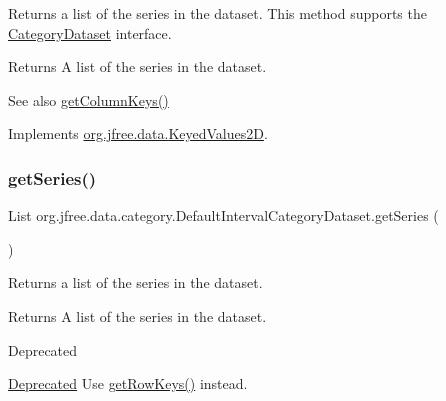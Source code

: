 Returns a list of the series in the dataset. This method supports the \mbox{\hyperlink{interfaceorg_1_1jfree_1_1data_1_1category_1_1_category_dataset}{Category\+Dataset}} interface.

\begin{DoxyReturn}{Returns}
A list of the series in the dataset.
\end{DoxyReturn}
\begin{DoxySeeAlso}{See also}
\mbox{\hyperlink{classorg_1_1jfree_1_1data_1_1category_1_1_default_interval_category_dataset_a1601fe05521b19269fc838d371907613}{get\+Column\+Keys()}} 
\end{DoxySeeAlso}


Implements \mbox{\hyperlink{interfaceorg_1_1jfree_1_1data_1_1_keyed_values2_d_aeda9aab284e61f69ca6e81370e76f70a}{org.\+jfree.\+data.\+Keyed\+Values2D}}.

\mbox{\label{classorg_1_1jfree_1_1data_1_1category_1_1_default_interval_category_dataset_a7e8cc76c4ac97fbf13459f1343ac5d91}} 
\subsubsection{\texorpdfstring{get\+Series()}{getSeries()}}
{\footnotesize\ttfamily List org.\+jfree.\+data.\+category.\+Default\+Interval\+Category\+Dataset.\+get\+Series (\begin{DoxyParamCaption}{ }\end{DoxyParamCaption})}

Returns a list of the series in the dataset.

\begin{DoxyReturn}{Returns}
A list of the series in the dataset.
\end{DoxyReturn}
\begin{DoxyRefDesc}{Deprecated}
\item[\mbox{\hyperlink{deprecated__deprecated000252}{Deprecated}}]Use \mbox{\hyperlink{classorg_1_1jfree_1_1data_1_1category_1_1_default_interval_category_dataset_aa8a0a871f4557e0ef292fe5e9db0d55b}{get\+Row\+Keys()}} instead. \end{DoxyRefDesc}
\mbox{\label{classorg_1_1jfree_1_1data_1_1category_1_1_default_interval_category_dataset_a78f53d6f3fd5af45da391c7473385ced}} 
